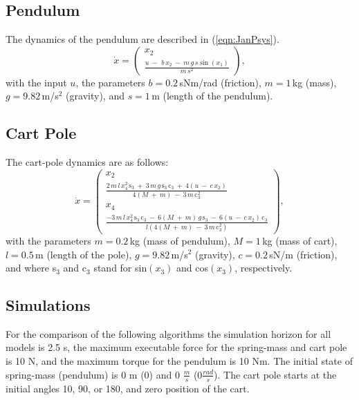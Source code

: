 \documentclass[letterpaper, 10 pt, conference]{ieeeconf}  %
\begin{document}
\subsection{Pendulum}
The dynamics of the pendulum are described in (\ref{eqn:JanPsys}).
\begin{equation}\label{eqn:JanPsys}
\dot{x}=
	\left( {\begin{array}{cc}
		x_2\\
		\tfrac{u \: - \: \,b\,x_2 \: - \: m\,g\,s\sin(x_1)}{m\,s^2}\end{array} } \right),
\end{equation}
with the input $u$, the parameters $b=0.2$\,sNm/rad (friction), $m=1$\,kg (mass), $g=9.82$\,m/s$^2$ (gravity), and $s=1$\,m (length of the pendulum).
\subsection{Cart Pole}
The cart-pole dynamics are as follows:
\begin{equation}\label{eqn:JanCPsys}
\dot{x}=
\left( {\begin{array}{cc}
	x_2\\
	\frac{2\,m\,l\,x_4^2\,\text{s}_3 \: + \: 3\,m\,g\,\text{s}_3\,\text{c}_3 \: + \: 4(u \: - \: c\,x_2)}{4(M \: + \: m) \: - \: 3\,m\,\text{c}_3^2}\\
	x_4\\
	\frac{-3\,m\,l\,x_4^2\,\text{s}_3\,\text{c}_3 \: - \: 6(M \: + \: m)\,g\,\text{s}_3 \: - \: 6(u \: - \: c\,x_2)\,\text{c}_3}{l(4(M \: + \: m) \: - \: 3\,m\,\text{c}_3^2)}\end{array} } \right),
\end{equation}
with the parameters $m=0.2$\,kg (mass of pendulum),  $M=1$\,kg (mass of cart), $l=0.5$\,m (length of the pole), $g=9.82$\,m/s$^2$ (gravity), $c=0.2$\,sN/m (friction), and where s$_3$ and c$_3$ stand for sin$(x_3)$ and cos$(x_3)$, respectively.

\subsection{Simulations}
For the comparison of the following algorithms the simulation horizon for all models is 2.5 s, the maximum executable force for the spring-mass and cart pole is 10 N, and the maximum torque for the pendulum is 10 Nm. The initial state of spring-mass (pendulum) is 0 m (0\textdegree) and 0 $\frac{m}{s}$ (0$\frac{rad}{s}$). The cart pole starts at the initial angles 10\textdegree, 90\textdegree, or 180\textdegree, and zero position of the cart. 
\end{document}
